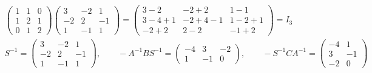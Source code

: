 \documentclass[12pt]{article}
\theoremstyle{definition}
\begin{document}
\begin{board}[\(S^{-1}\) (\(SS^{-1}=I_3\); \lec{2}, \lit{Theorem~15}); the off-diagonal blocks of \(M^{-1}\)
(Corollary~\ref{b5.10}):]
\[
\begin{gathered}
\begin{pmatrix}1&1&0\\1&2&1\\0&1&2\end{pmatrix}\begin{pmatrix}3&-2&1\\-2&2&-1\\1&-1&1\end{pmatrix}
=\begin{pmatrix}3-2&-2+2&1-1\\3-4+1&-2+4-1&1-2+1\\-2+2&2-2&-1+2\end{pmatrix}=I_3\\
S^{-1}=\begin{pmatrix}3&-2&1\\-2&2&-1\\1&-1&1\end{pmatrix},\qquad
-A^{-1}BS^{-1}=\begin{pmatrix}-4&3&-2\\1&-1&0\end{pmatrix},\qquad
-S^{-1}CA^{-1}=\begin{pmatrix}-4&1\\3&-1\\-2&0\end{pmatrix}
\end{gathered}
\]
\end{board}
\end{document}
